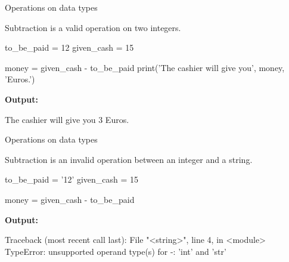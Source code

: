 \documentclass[
  american,
  ignorenonframetext,
]{beamer}
\newenvironment{pyexec}[1]{\noindent \textbf{Output: }  #1}{}
\begin{document}
\begin{frame}{Operations on data types}
\protect\hypertarget{operations-on-data-types}{}

Subtraction is a valid operation on two integers.

\begin{pythoncode}

to_be_paid = 12
given_cash = 15

money = given_cash - to_be_paid
print('The cashier will give you', money, 'Euros.')

\end{pythoncode}

\begin{pyexec}

\begin{outputcode}

The cashier will give you 3 Euros.

\end{outputcode}

\end{pyexec}

\end{frame}

\begin{frame}{Operations on data types}
\protect\hypertarget{operations-on-data-types-1}{}

Subtraction is an invalid operation between an integer and a string.

\begin{pythoncode}

to_be_paid = '12'
given_cash = 15

money = given_cash - to_be_paid

\end{pythoncode}

\begin{pyexec}

\begin{outputcode}

Traceback (most recent call last):
  File "<string>", line 4, in <module>
TypeError: unsupported operand type(s) for -: 'int'
and 'str'

\end{outputcode}

\end{pyexec}

\end{frame}
\end{document}
